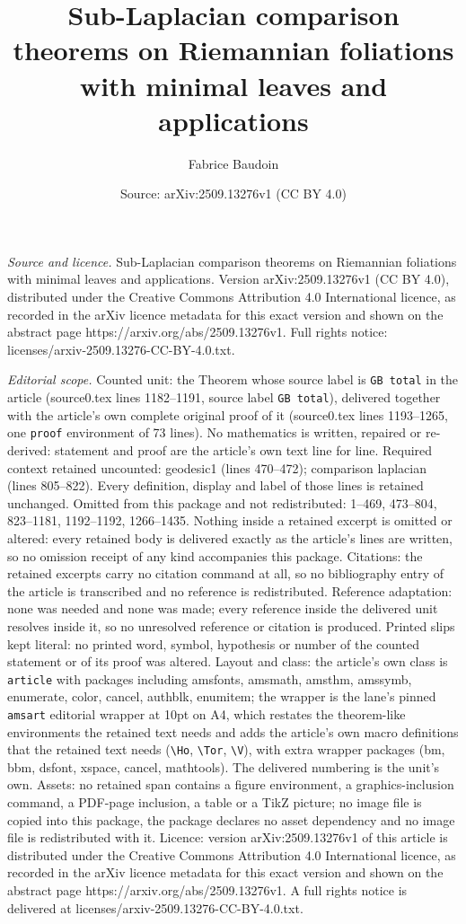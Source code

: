 \documentclass[10pt,a4paper]{amsart}
\title[Sub-Laplacian comparison theorems on Riemannian foliations w]{Sub-Laplacian comparison theorems on Riemannian foliations with minimal leaves and applications}
\author{Fabrice Baudoin}
\date{Source: arXiv:2509.13276v1 (CC BY 4.0)}
\begin{document}
\maketitle

\noindent\emph{Source and licence.} Sub-Laplacian comparison theorems on Riemannian foliations with minimal leaves and applications. Version arXiv:2509.13276v1 (CC BY 4.0), distributed under the Creative Commons Attribution 4.0 International licence, as recorded in the arXiv licence metadata for this exact version and shown on the abstract page https://arxiv.org/abs/2509.13276v1. Full rights notice: licenses/arxiv-2509.13276-CC-BY-4.0.txt.\par\smallskip

\noindent\textit{Editorial scope.} Counted unit: the Theorem whose source label is \texttt{GB total} in the article (source0.tex lines 1182--1191, source label \texttt{GB total}), delivered together with the article's own complete original proof of it (source0.tex lines 1193--1265, one \texttt{proof} environment of 73 lines). No mathematics is written, repaired or re-derived: statement and proof are the article's own text line for line. Required context retained uncounted: geodesic1 (lines 470--472); comparison laplacian (lines 805--822). Every definition, display and label of those lines is retained unchanged. Omitted from this package and not redistributed: 1--469, 473--804, 823--1181, 1192--1192, 1266--1435. Nothing inside a retained excerpt is omitted or altered: every retained body is delivered exactly as the article's lines are written, so no omission receipt of any kind accompanies this package. Citations: the retained excerpts carry no citation command at all, so no bibliography entry of the article is transcribed and no reference is redistributed. Reference adaptation: none was needed and none was made; every reference inside the delivered unit resolves inside it, so no unresolved reference or citation is produced. Printed slips kept literal: no printed word, symbol, hypothesis or number of the counted statement or of its proof was altered. Layout and class: the article's own class is \texttt{article} with packages including amsfonts, amsmath, amsthm, amssymb, enumerate, color, cancel, authblk, enumitem; the wrapper is the lane's pinned \texttt{amsart} editorial wrapper at 10pt on A4, which restates the theorem-like environments the retained text needs and adds the article's own macro definitions that the retained text needs (\texttt{\textbackslash Ho}, \texttt{\textbackslash Tor}, \texttt{\textbackslash V}), with extra wrapper packages (bm, bbm, dsfont, xspace, cancel, mathtools). The delivered numbering is the unit's own. Assets: no retained span contains a figure environment, a graphics-inclusion command, a PDF-page inclusion, a table or a TikZ picture; no image file is copied into this package, the package declares no asset dependency and no image file is redistributed with it. Licence: version arXiv:2509.13276v1 of this article is distributed under the Creative Commons Attribution 4.0 International licence, as recorded in the arXiv licence metadata for this exact version and shown on the abstract page https://arxiv.org/abs/2509.13276v1. A full rights notice is delivered at licenses/arxiv-2509.13276-CC-BY-4.0.txt. 
\end{document}
